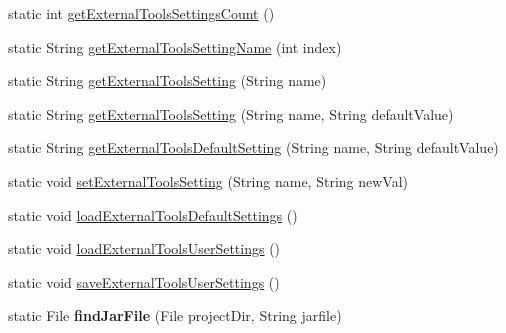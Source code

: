 \begin{DoxyCompactItemize}
\item 
static int \hyperlink{classorg_1_1contikios_1_1cooja_1_1Cooja_add03d6c09080fa4591c9e4ed355eac71}{get\-External\-Tools\-Settings\-Count} ()
\item 
static String \hyperlink{classorg_1_1contikios_1_1cooja_1_1Cooja_ac2c460c7da1753ce5942e82f716f9ed5}{get\-External\-Tools\-Setting\-Name} (int index)
\item 
static String \hyperlink{classorg_1_1contikios_1_1cooja_1_1Cooja_a4a891672ef77e46ce486abb472bf1393}{get\-External\-Tools\-Setting} (String name)
\item 
static String \hyperlink{classorg_1_1contikios_1_1cooja_1_1Cooja_ad9b5e51fbc583c20fa32b1dcce124916}{get\-External\-Tools\-Setting} (String name, String default\-Value)
\item 
static String \hyperlink{classorg_1_1contikios_1_1cooja_1_1Cooja_a4e47d8ac0682f1e76dd27b7f0410570b}{get\-External\-Tools\-Default\-Setting} (String name, String default\-Value)
\item 
static void \hyperlink{classorg_1_1contikios_1_1cooja_1_1Cooja_a05369f1ac93204a267408c75a4db3e74}{set\-External\-Tools\-Setting} (String name, String new\-Val)
\item 
static void \hyperlink{classorg_1_1contikios_1_1cooja_1_1Cooja_a3c6349c155d43188f16016e48e71186d}{load\-External\-Tools\-Default\-Settings} ()
\item 
static void \hyperlink{classorg_1_1contikios_1_1cooja_1_1Cooja_a542b92835383b2a2da3a51e32fcae6e4}{load\-External\-Tools\-User\-Settings} ()
\item 
static void \hyperlink{classorg_1_1contikios_1_1cooja_1_1Cooja_ac3c796538b224b5e3277c98ecf013599}{save\-External\-Tools\-User\-Settings} ()
\item 
\hypertarget{classorg_1_1contikios_1_1cooja_1_1Cooja_a162ab2becc2d790de1d11d205c902149}{static File {\bfseries find\-Jar\-File} (File project\-Dir, String jarfile)}\label{classorg_1_1contikios_1_1cooja_1_1Cooja_a162ab2becc2d790de1d11d205c902149}


\end{DoxyCompactItemize}
